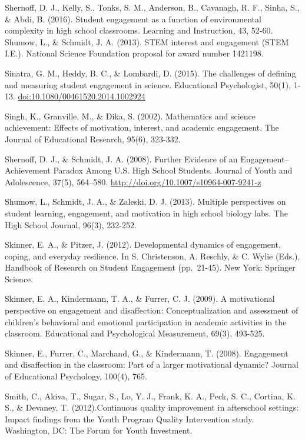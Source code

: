 \documentclass[]{book}
\theoremstyle{definition}
\theoremstyle{definition}
\theoremstyle{definition}
\theoremstyle{remark}
\begin{document}
Shernoff, D. J., Kelly, S., Tonks, S. M., Anderson, B., Cavanagh, R. F.,
Sinha, S., \& Abdi, B. (2016). Student engagement as a function of
environmental complexity in high school classrooms. Learning and
Instruction, 43, 52-60.\\
Shumow, L., \& Schmidt, J. A. (2013). STEM interest and engagement (STEM
I.E.). National Science Foundation proposal for award number 1421198.

Sinatra, G. M., Heddy, B. C., \& Lombardi, D. (2015). The challenges of
defining and measuring student engagement in science. Educational
Psychologist, 50(1), 1-13. \url{doi:10.1080/00461520.2014.1002924}

Singh, K., Granville, M., \& Dika, S. (2002). Mathematics and science
achievement: Effects of motivation, interest, and academic engagement.
The Journal of Educational Research, 95(6), 323-332.

Shernoff, D. J., \& Schmidt, J. A. (2008). Further Evidence of an
Engagement--Achievement Paradox Among U.S. High School Students. Journal
of Youth and Adolescence, 37(5), 564--580.
\url{http://doi.org/10.1007/s10964-007-9241-z}

Shumow, L., Schmidt, J. A., \& Zaleski, D. J. (2013). Multiple
perspectives on student learning, engagement, and motivation in high
school biology labs. The High School Journal, 96(3), 232-252.

Skinner, E. A., \& Pitzer, J. (2012). Developmental dynamics of
engagement, coping, and everyday resilience. In S. Christenson, A.
Reschly, \& C. Wylie (Eds.), Handbook of Research on Student Engagement
(pp.~21-45). New York: Springer Science.

Skinner, E. A., Kindermann, T. A., \& Furrer, C. J. (2009). A
motivational perspective on engagement and disaffection:
Conceptualization and assessment of children's behavioral and emotional
participation in academic activities in the classroom. Educational and
Psychological Measurement, 69(3), 493-525.

Skinner, E., Furrer, C., Marchand, G., \& Kindermann, T. (2008).
Engagement and disaffection in the classroom: Part of a larger
motivational dynamic? Journal of Educational Psychology, 100(4), 765.

Smith, C., Akiva, T., Sugar, S., Lo, Y. J., Frank, K. A., Peck, S. C.,
Cortina, K. S., \& Devaney, T. (2012).Continuous quality improvement in
afterschool settings: Impact findings from the Youth Program Quality
Intervention study. Washington, DC: The Forum for Youth Investment.
\end{document}
